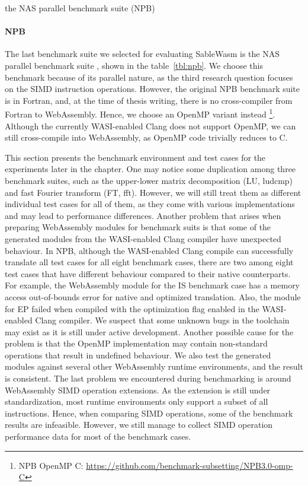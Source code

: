 \begin{table}
    \centering
    
    \caption{the NAS parallel benchmark suite (NPB)}
    \label{tbl:npb}
\end{table}

\paragraph{NPB}
The last benchmark suite we selected for evaluating SableWasm is the NAS
parallel benchmark suite \cite{npb}, shown in the table~\ref{tbl:npb}. We
choose this benchmark because of its parallel nature, as the third research
question focuses on the SIMD instruction operations. However, the original
NPB benchmark suite is in Fortran, and, at the time of thesis writing, there is
no cross-compiler from Fortran to WebAssembly. Hence, we choose an OpenMP
variant instead \footnote{NPB OpenMP C:
    \url{https://github.com/benchmark-subsetting/NPB3.0-omp-C}}. Although the
currently WASI-enabled Clang does not support OpenMP, we can still
cross-compile into WebAssembly, as OpenMP code trivially reduces to C.

This section presents the benchmark environment and test cases for the
experiments later in the chapter. One may notice some duplication among three
benchmark suites, such as the upper-lower matrix decomposition (LU, ludcmp)
and fast Fourier transform (FT, fft). However, we will still treat them as
different individual test cases for all of them, as they come with various
implementations and may lead to performance differences. Another problem that
arises when preparing WebAssembly modules for benchmark suits is that some of
the generated modules from the WASI-enabled Clang compiler have unexpected
behaviour. In NPB, although the WASI-enabled Clang compile can successfully
translate all test cases for all eight benchmark cases, there are two among
eight test cases that have different behaviour compared to their native
counterparts. For example, the WebAssembly module for the IS benchmark case
has a memory access out-of-bounds error for native and optimized translation.
Also, the module for EP failed when compiled with the optimization flag enabled
in the WASI-enabled Clang compiler. We suspect that some unknown bugs in the
toolchain may exist as it is still under active development. Another
possible cause for the problem is that the OpenMP implementation may contain
non-standard operations that result in undefined behaviour. We also test the
generated modules against several other WebAssembly runtime environments, and
the result is consistent. The last problem we encountered during benchmarking is
around WebAssembly SIMD operation extensions. As the extension is still under
standardization, most runtime environments only support a subset of all
instructions. Hence, when comparing SIMD operations, some of the benchmark
results are infeasible. However, we still manage to collect SIMD operation
performance data for most of the benchmark cases.

